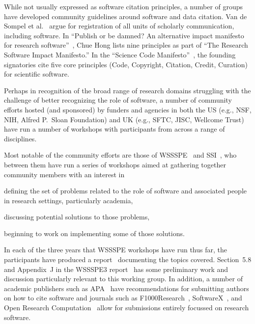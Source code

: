 \documentclass[12pt, oneside]{amsart}
\begin{document}
While not usually expressed as software citation principles, a number of groups
have developed community guidelines around software and data citation. Van de
Sompel et al.~\cite{VandeSompel2004} argue for registration of all units of
scholarly communication, including software. In ``Publish or be damned? An
alternative impact manifesto for research
software''~\cite{ssi-publish-or-be-damned}, Chue Hong lists nine principles as
part of ``The Research Software Impact Manifesto.'' In the
``Science Code Manifesto''~\cite{sciencecodemanifesto}, the founding signatories
cite five core principles (Code, Copyright, Citation, Credit, Curation) for
scientific software.

Perhaps in recognition of the broad range of research domains struggling with
the challenge of better recognizing the role of software, a number of community
efforts hosted (and sponsored) by funders and agencies in both the US (e.g.,
NSF, NIH, Alfred P.\ Sloan Foundation) and UK (e.g., SFTC, JISC, Wellcome Trust)
have run a number of workshops with participants from across a range of
disciplines.

Most notable of the community efforts are those of WSSSPE~\cite{wssspe} and
SSI~\cite{ssi-workshops}, who between them have run a series of workshops aimed
at gathering together community members with an interest in
\begin{enumerate*}[series=InlineList, before=\hspace{-0.6ex}]
    \item defining the set
of problems related to the role of software and associated people in research
settings, particularly academia,
    \item discussing potential solutions to those
problems,
\item beginning to work on implementing some of those solutions.
  \end{enumerate*}
In each of the three years that WSSSPE workshops have run thus far, the
participants have produced a report~\cite{WSSSPE1,WSSSPE2,WSSSPE3} documenting
the topics covered. Section~5.8 and Appendix~J in the WSSSPE3
report~\cite{WSSSPE3} has some preliminary work and discussion particularly
relevant to this working group.  In addition, a number of academic publishers
such as APA~\cite{APA-guidelines} have recommendations for submitting authors on
how to cite software and journals such as F1000Research~\cite{F1000},
SoftwareX~\cite{softwareX}, and Open Research Computation~\cite{ORC} allow
for submissions entirely focussed on research software.
\end{document}
